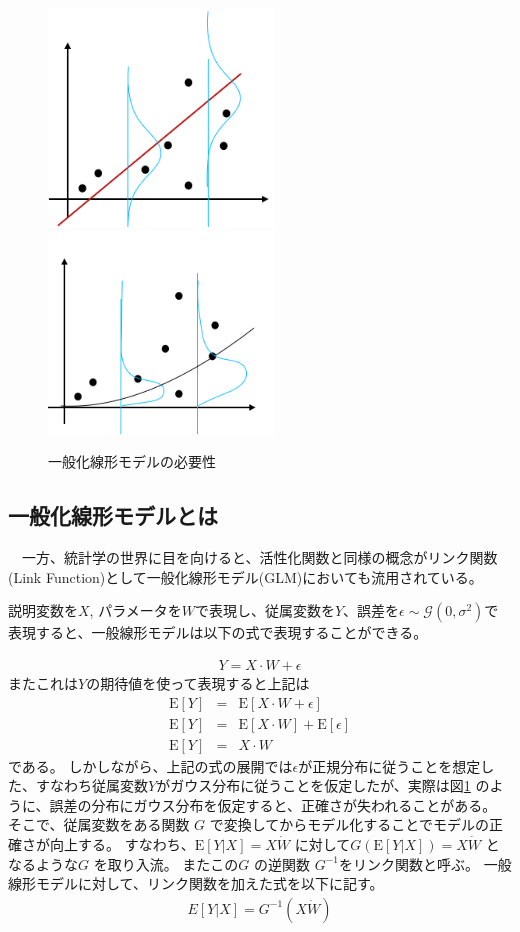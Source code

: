 \begin{figure}[hbtp]
        \includegraphics[width=6cm]{asset/glm1.png}~~~~~ ~~~~~ 
        \includegraphics[width=6cm]{asset/glm2.png}
            \caption{一般化線形モデルの必要性}
            \label{glm}
\end{figure}

\subsection{一般化線形モデルとは}
　一方、統計学の世界に目を向けると、活性化関数と同様の概念がリンク関数(Link Function)として一般化線形モデル(GLM)においても流用されている。

説明変数を$ X $, パラメータを$ W $で表現し、従属変数を$ Y $、誤差を$ \epsilon \sim \mathcal{G}(0, \sigma^2) $で表現すると、一般線形モデルは以下の式で表現することができる。

\begin{eqnarray}
Y = X \cdot W + \epsilon
\label{eq:senkei}
\end{eqnarray}
またこれは$ Y $の期待値を使って表現すると上記は
\begin{eqnarray}
    \mathrm{E}[Y] &=& \mathrm{E}[X \cdot W + \epsilon] \\
    \mathrm{E}[Y] &=& \mathrm{E}[X \cdot W] + \mathrm{E}[\epsilon] \\
    \mathrm{E}[Y] &=& X \cdot W
\label{eq:link}
\end{eqnarray}
である。
しかしながら、上記の式の展開では$ \epsilon $が正規分布に従うことを想定した、すなわち従属変数$ Y $がガウス分布に従うことを仮定したが、実際は図\ref{glm} のように、誤差の分布にガウス分布を仮定すると、正確さが失われることがある。
そこで、従属変数をある関数 $ G $ で変換してからモデル化することでモデルの正確さが向上する。
すなわち、$ \mathrm{E}[Y|X] = X \dot W $ に対して$ G(\mathrm{E}[Y|X]) = X \dot W $ となるような$ G $ を取り入流。
またこの$ G $ の逆関数 $ G^{-1} $をリンク関数と呼ぶ。
一般線形モデルに対して、リンク関数を加えた式を以下に記す。
\begin{eqnarray}
E[Y|X]=G^{-1} (X\dot W)
\label{eq:link}
\end{eqnarray}

